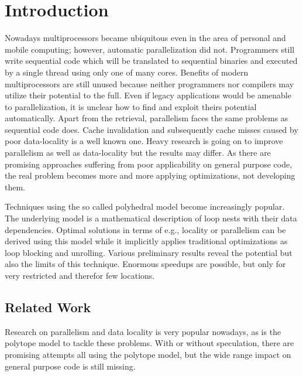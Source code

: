 
\chapter{Introduction} %
\label{Chapter1}


Nowadays multiprocessors became ubiquitous even in the area of personal and 
mobile computing; however, automatic parallelization did not. 
Programmers still write sequential code which will be
translated to sequential binaries and executed by a single thread using only
one of many cores. %
Benefits of modern multiprocessors are still unused because neither programmers 
nor compilers may utilize their potential to the full.
Even if legacy applications would be amenable to parallelization, it is unclear 
how to find and exploit theirs potential automatically.  
Apart from the retrieval, parallelism faces the same problems as sequential
code does. Cache invalidation and subsequently cache misses 
caused by poor data-locality is a well known one. 
Heavy research is going on to improve parallelism as well as  data-locality 
but the results may differ.
As there are promising approaches suffering from poor applicability on general 
purpose code, the real problem becomes more and more applying optimizations, not
developing them. 


Techniques using the so called polyhedral model become increasingly popular.
The underlying model is a mathematical description of loop nests with 
their data dependencies. Optimal solutions in terms of e.g., locality or 
parallelism can be derived using this model while it implicitly applies 
traditional optimizations as loop blocking and unrolling. 
Various preliminary results reveal the potential but also the
limits of this technique. Enormous speedups are possible, 
but only for very restricted and therefor few locations.



\section{Related Work}
Research on parallelism and data locality is very popular nowadays, as is the 
polytope model to tackle these problems. With or without speculation, there are
promising attempts all using the polytope model, but the wide range 
impact on general purpose code is still missing.

